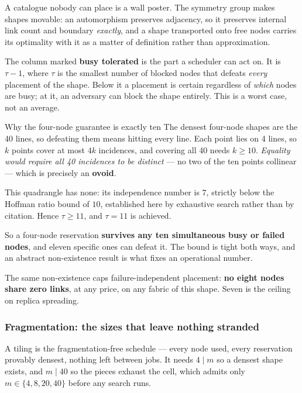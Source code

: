 \documentclass[11pt,letterpaper]{article}
\begin{document}
A catalogue nobody can place is a wall poster. The symmetry group makes shapes
movable: an automorphism preserves adjacency, so it preserves internal link
count and boundary \emph{exactly}, and a shape transported onto free nodes
carries its optimality with it as a matter of definition rather than
approximation.

The column marked \textbf{busy tolerated} is the part a scheduler can act on. It
is $\tau-1$, where $\tau$ is the smallest number of blocked nodes that defeats
\emph{every} placement of the shape. Below it a placement is certain regardless
of \emph{which} nodes are busy; at it, an adversary can block the shape
entirely. This is a worst case, not an average.

\begin{keybox}{Why the four-node guarantee is exactly ten}
The densest four-node shapes are the 40 lines, so defeating them means hitting
every line. Each point lies on 4 lines, so $k$ points cover at most $4k$
incidences, and covering all 40 needs $k\ge10$. \emph{Equality would require all
40 incidences to be distinct} --- no two of the ten points collinear --- which
is precisely an \textbf{ovoid}.

\smallskip
This quadrangle has none: its independence number is $7$, strictly below the
Hoffman ratio bound of $10$, established here by exhaustive search rather than
by citation. Hence $\tau\ge11$, and $\tau=11$ is achieved.

\smallskip
So a four-node reservation \textbf{survives any ten simultaneous busy or failed
nodes}, and eleven specific ones can defeat it. The bound is tight both ways,
and an abstract non-existence result is what fixes an operational number.
\end{keybox}

The same non-existence caps failure-independent placement: \textbf{no eight
nodes share zero links}, at any price, on any fabric of this shape. Seven is the
ceiling on replica spreading.

\subsubsection{Fragmentation: the sizes that leave nothing stranded}

A tiling is the fragmentation-free schedule --- every node used, every
reservation provably densest, nothing left between jobs. It needs $4\mid m$ so a
densest shape exists, and $m\mid40$ so the pieces exhaust the cell, which admits
only $m\in\{4,8,20,40\}$ before any search runs.
\end{document}
